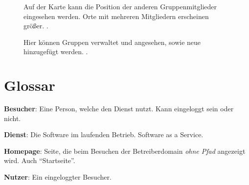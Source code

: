\documentclass[parskip=full,11pt,twoside]{scrartcl}
\begin{document}
\begin{figure}[hb]
		\caption{\label{fig:map}
			Auf der Karte kann die Position der anderen Gruppenmitglieder eingesehen werden.
			Orte mit mehreren Mitgliedern erscheinen größer.
			.
		}
\end{figure}

\begin{figure}[hb]
		\caption{\label{fig:groups}
			Hier können Gruppen verwaltet und angesehen, sowie neue hinzugefügt werden.
			.
		}
\end{figure}

\section{Glossar}

\textbf{Besucher}:
Eine Person, welche den Dienst nutzt.
Kann eingeloggt sein oder nicht.

\textbf{Dienst}:
Die Software im laufenden Betrieb. Software as a Service.

\textbf{Homepage}:
Seite, die beim Besuchen der Betreiberdomain \emph{ohne Pfad} angezeigt wird. Auch \enquote{Startseite}.

\textbf{Nutzer}:
Ein eingeloggter Besucher.
\end{document}
